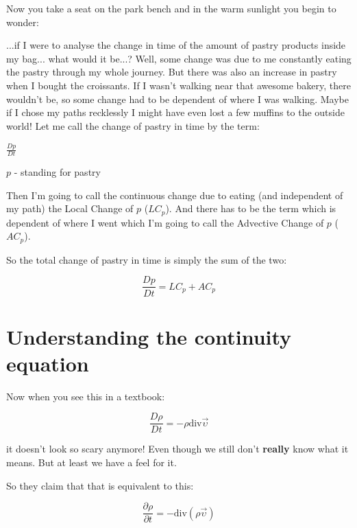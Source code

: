 \documentclass[12pt]{report}
\begin{document}
Now you take a seat on the park bench and in the warm sunlight you begin to wonder:

...if I were to analyse the change in time of the amount of pastry products inside my bag... what would it be...? Well, some change was due to me constantly eating the pastry through my whole journey. But there was also an increase in pastry when I bought the croissants. If I wasn't walking near that awesome bakery, there wouldn't be, so some change had to be dependent of where I was walking. Maybe if I chose my paths recklessly I might have even lost a few muffins to the outside world! Let me call the change of pastry in time by the term:

$\frac{Dp}{Dt}$

$p$ - standing for pastry

Then I'm going to call the continuous change due to eating (and independent of my path) the Local Change of $p$ ($LC_p$). And there has to be the term which is dependent of where I went which I'm going to call the Advective Change of $p$ ($AC_p$).

So the total change of pastry in time is simply the sum of the two:

\begin{equation}
\frac{Dp}{Dt} = LC_p + AC_p
\end{equation}






\section{Understanding the continuity equation}

Now when you see this in a textbook:

\begin{equation}
\frac{D \rho}{D t} = - \rho \text{div} \vec{\upsilon}
\end{equation}

it doesn't look so scary anymore! Even though we still don't \textbf{really} know what it means. But at least we have a feel for it.







So they claim that that is equivalent to this:

\begin{equation}
\frac{\partial \rho}{\partial t} = - \text{div} (\rho \vec{\upsilon})
\end{equation}
\end{document}
